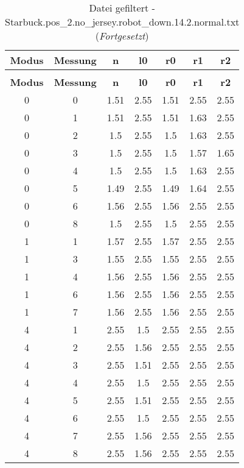\begin{longtable}{|c|c||c||c||c|c|c|}
	\caption{Datei gefiltert - Starbuck.pos\_2.no\_jersey.robot\_down.14.2.normal.txt} \label{tab:Starbuck.pos-2.no-jersey.robot-down.14.2.normal.txt} \\ \hline
	\textbf{Modus} & \textbf{Messung} & \textbf{n} & \textbf{l0} & \textbf{r0} & \textbf{r1} & \textbf{r2}\\ \hline
	\endfirsthead
	\caption[]{Datei gefiltert - Starbuck.pos\_2.no\_jersey.robot\_down.14.2.normal.txt (\emph{Fortgesetzt})} \\ \hline
	\textbf{Modus} & \textbf{Messung} & \textbf{n} & \textbf{l0} & \textbf{r0} & \textbf{r1} & \textbf{r2}\\ \hline
	\endhead
	0 & 0 & 1.51 & 2.55 & 1.51 & 2.55 & 2.55 \\ \hline
	0 & 1 & 1.51 & 2.55 & 1.51 & 1.63 & 2.55 \\ \hline
	0 & 2 & 1.5 & 2.55 & 1.5 & 1.63 & 2.55 \\ \hline
	0 & 3 & 1.5 & 2.55 & 1.5 & 1.57 & 1.65 \\ \hline
	0 & 4 & 1.5 & 2.55 & 1.5 & 1.63 & 2.55 \\ \hline
	0 & 5 & 1.49 & 2.55 & 1.49 & 1.64 & 2.55 \\ \hline
	0 & 6 & 1.56 & 2.55 & 1.56 & 2.55 & 2.55 \\ \hline
	0 & 8 & 1.5 & 2.55 & 1.5 & 2.55 & 2.55 \\ \hline
	1 & 1 & 1.57 & 2.55 & 1.57 & 2.55 & 2.55 \\ \hline
	1 & 3 & 1.55 & 2.55 & 1.55 & 2.55 & 2.55 \\ \hline
	1 & 4 & 1.56 & 2.55 & 1.56 & 2.55 & 2.55 \\ \hline
	1 & 6 & 1.56 & 2.55 & 1.56 & 2.55 & 2.55 \\ \hline
	1 & 7 & 1.56 & 2.55 & 1.56 & 2.55 & 2.55 \\ \hline
	4 & 1 & 2.55 & 1.5 & 2.55 & 2.55 & 2.55 \\ \hline
	4 & 2 & 2.55 & 1.56 & 2.55 & 2.55 & 2.55 \\ \hline
	4 & 3 & 2.55 & 1.51 & 2.55 & 2.55 & 2.55 \\ \hline
	4 & 4 & 2.55 & 1.5 & 2.55 & 2.55 & 2.55 \\ \hline
	4 & 5 & 2.55 & 1.51 & 2.55 & 2.55 & 2.55 \\ \hline
	4 & 6 & 2.55 & 1.5 & 2.55 & 2.55 & 2.55 \\ \hline
	4 & 7 & 2.55 & 1.56 & 2.55 & 2.55 & 2.55 \\ \hline
	4 & 8 & 2.55 & 1.56 & 2.55 & 2.55 & 2.55 \\ \hline

\end{longtable}
